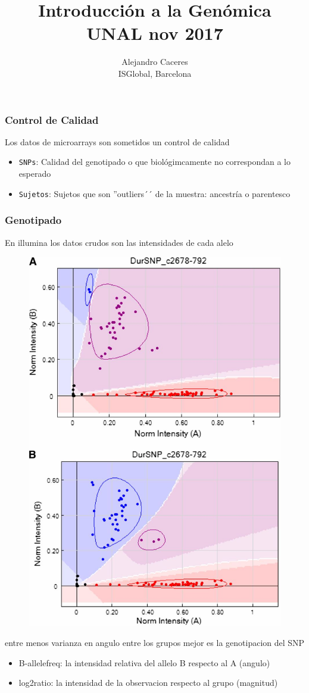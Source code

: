 \documentclass{beamer}\usepackage[]{graphicx}\usepackage[]{color}
\begin{document}
\title{Introducci\'on a la Gen\'omica \\ UNAL nov 2017}
\author{Alejandro Caceres \\ ISGlobal, Barcelona}


\maketitle


\begin{frame}[fragile]
\frametitle{Control de Calidad}
Los datos de microarrays son sometidos un control de calidad
\begin{itemize}

\item {\tt SNPs}: Calidad del genotipado o que biol\'ogimcamente no correspondan a lo esperado 

\item {\tt Sujetos}: Sujetos que son ''outliers´´ de la muestra: ancestr\'ia o parentesco 

\end{itemize}
\end{frame}

\begin{frame}[fragile]
\frametitle{Genotipado}
En illumina los datos crudos son las intensidades de cada alelo

\begin{figure}[htbp]
\begin{center}
\includegraphics[width=.5\linewidth]{clustermicro.jpg}
\end{center}
\end{figure}

entre menos varianza en angulo entre los grupos mejor es la genotipacion del SNP

\begin{itemize}
\item B-allelefreq: la intensidad relativa del allelo B respecto al A (angulo)
\item log2ratio: la intensidad de la observacion respecto al grupo (magnitud)
\end{itemize}

\end{frame}
\end{document}

